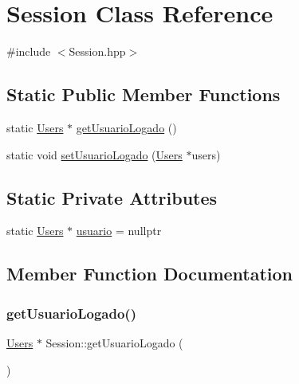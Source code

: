 \hypertarget{class_session}{}\section{Session Class Reference}
\label{class_session}


{\ttfamily \#include $<$Session.\+hpp$>$}

\subsection*{Static Public Member Functions}
\begin{DoxyCompactItemize}
\item 
static \hyperlink{class_users}{Users} $\ast$ \hyperlink{class_session_a9c79167d427882def39d7aa5b7bab439}{get\+Usuario\+Logado} ()
\item 
static void \hyperlink{class_session_acefef4227ca35a5f2661c29deb535e40}{set\+Usuario\+Logado} (\hyperlink{class_users}{Users} $\ast$users)
\end{DoxyCompactItemize}
\subsection*{Static Private Attributes}
\begin{DoxyCompactItemize}
\item 
static \hyperlink{class_users}{Users} $\ast$ \hyperlink{class_session_ab20e9b5ce783a5539dd56f486ac5e277}{usuario} = nullptr
\end{DoxyCompactItemize}


\subsection{Member Function Documentation}
\mbox{\label{class_session_a9c79167d427882def39d7aa5b7bab439}} 
\subsubsection{\texorpdfstring{get\+Usuario\+Logado()}{getUsuarioLogado()}}
{\footnotesize\ttfamily \hyperlink{class_users}{Users} $\ast$ Session\+::get\+Usuario\+Logado (\begin{DoxyParamCaption}{ }\end{DoxyParamCaption})\hspace{0.3cm}{\ttfamily [static]}}

